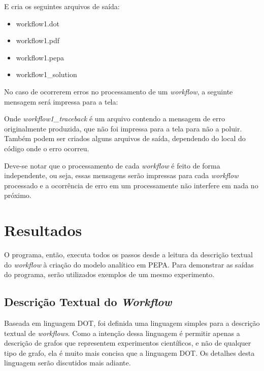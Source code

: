 \documentclass[a4paper,11pt]{article}
\begin{document}
            E cria os seguintes arquivos de saída:
            \begin{itemize}
                \item workflow1.dot
                \item workflow1.pdf
                \item workflow1.pepa
                \item workflow1\_solution
            \end{itemize}

            No caso de ocorrerem erros no processamento de um \emph{workflow}, a seguinte mensagem ser\'a impressa para a tela:
            

            Onde \emph{workflow1\_traceback} \'e um arquivo contendo a mensagem de erro originalmente produzida, que não foi impressa para a tela para não a poluir. Também podem ser criados alguns arquivos de saída, dependendo do local do c\'odigo onde o erro ocorreu.

            Deve-se notar que o processamento de cada \emph{workflow} \'e feito de forma independente, ou seja, essas mensagens serão impressas para cada \emph{workflow} processado e a ocorr\^encia de erro em um processamente não interfere em nada no pr\'oximo.

  \newpage
  \section{Resultados}

  	O programa, então, executa todos os passos desde a leitura da descrição textual do \emph{workflow} à criação do modelo analítico em PEPA. Para demonstrar as saídas do programa, serão utilizados exemplos de um mesmo experimento.

  	\subsection{Descrição Textual do \emph{Workflow}}
  		Baseada em linguagem DOT, foi definida uma linguagem simples para a descrição textual de \emph{workflows}. Como a intenção dessa linguagem é permitir apenas a descrição de grafos que representem experimentos científicos, e não de qualquer tipo de grafo, ela é muito mais concisa que a linguagem DOT. Os detalhes desta linguagem serão discutidos mais adiante.

	  	
	  	
\end{document}
